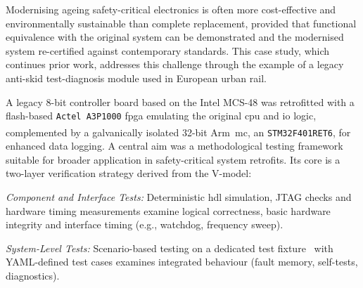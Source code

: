 Modernising ageing safety-critical electronics is often more cost-effective and environmentally sustainable than complete replacement, provided that functional equivalence with the original system can be demonstrated and the modernised system re-certified against contemporary standards. This case study, which continues prior work, addresses this challenge through the example of a legacy anti-skid test-diagnosis module used in European urban rail.

A legacy 8-bit controller board based on the Intel MCS-48 was retrofitted with a flash-based \texttt{Actel~A3P1000} \gls{fpga} emulating the original \gls{cpu} and \gls{io} logic, complemented by a galvanically isolated 32-bit Arm\textsuperscript{\textregistered}~\gls{mc}, an \texttt{STM32F401RET6}, for enhanced data logging. A central aim was a methodological testing framework suitable for broader application in safety-critical system retrofits. Its core is a two-layer verification strategy derived from the V-model:
\begin{enumerate*}[label=(\arabic*)]
	\item \textit{Component and Interface Tests:} Deterministic \gls{hdl} simulation, JTAG checks and hardware timing measurements examine logical correctness, basic hardware integrity and interface timing (e.g., watchdog, frequency sweep).
	\item \textit{System-Level Tests:} Scenario-based testing on a dedicated test fixture~\cite{dolata2023} with YAML-defined test cases examines integrated behaviour (fault memory, self-tests, diagnostics).
\end{enumerate*}
